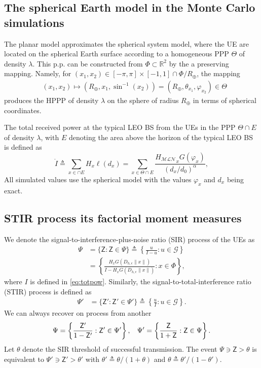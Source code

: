 \documentclass[lettersize,journal]{IEEEtran}
\newcommand{\rEarth}{R_{\oplus}}
\newcommand{\R}{\mathbb{R}}
\begin{document}
\subsection{The spherical Earth model in the Monte Carlo simulations }

\label{sec:sphericalmodel}
The planar model approximates the spherical system model, where the UE are located on the spherical Earth surface according to a homogeneous PPP $\Theta$ of density $\lambda$. This p.p. can be constructed from $\Phi \subset \R^2$ by the a preserving mapping. Namely, for $(x_1,x_2) \in [-\pi,\pi]\times[-1,1]\cap\Phi/\rEarth$, the mapping 
\begin{align}
  &(x_1,x_2)\mapsto (\rEarth,x_1,\sin^{-1}(x_2))=(\rEarth,\theta_{x_1},\varphi_{x_2}) \in \Theta
\end{align}
 produces the HPPP of density $\lambda$ on the sphere of radius $\rEarth$ in terms of spherical coordinates.

The total received power at the typical LEO BS from the UEs in the PPP $\Theta \cap E $ of density $\lambda$, with $E$ denoting the area above the horizon of the typical LEO BS is defined as
\begin{equation}
  \label{eq:mathringptot}
  \mathring{I} \triangleq  \sum_{x \in \cap E } H_x\ell(d_x) = \sum_{x \in \Theta \cap E }  \frac{{H_{\mathcal{M}\mathcal{L}\mathcal{N}}}_x G(\varphi_x)}{(d_x/d_0)^{\alpha}},
\end{equation}
All simulated values use the spherical model with the values $\varphi_x$ and $d_x$ being exact. 



\subsection{STIR process its factorial moment measures}
 We denote the signal-to-interference-plus-noise ratio (SIR) process of the UEs as
\begin{align}
  \label{eq:SINR}
  \Psi &= \{\mathsf{Z}: \mathsf{Z} \in \Psi\} \triangleq \left\{ \frac{u}{I-u} : u \in \mathcal{G}\right\} \nonumber \\
  &=\left\{ \frac{H_x G(D_{h,\epsilon}\|x\|)}{I-H_x G(D_{h,\epsilon}\|x\|)} : x \in \Phi\right\},
\end{align}
where $I$ is defined in \eqref{eq:totpow}. Similarly, the signal-to-total-interference ratio (STIR) process is defined as
\begin{align}
  \label{eq:STINR}
  \Psi' &= \{\mathsf{Z}': \mathsf{Z}' \in \Psi'\} \triangleq \left\{ \frac{u}{I} : u \in \mathcal{G}\right\}.
\end{align}
We can always recover on process from another
\begin{equation}
  \Psi = \left\{ \frac{\mathsf{Z}'}{1- \mathsf{Z}'}: \mathsf{Z}' \in \Psi' \right\}, \hspace{0.3cm} \Psi' = \left\{ \frac{\mathsf{Z}}{1+ \mathsf{Z}}: \mathsf{Z} \in \Psi \right\}.
\end{equation}
Let $\theta$ denote the SIR threshold of successful transmission. The event $\Psi \ni\mathsf{Z}> \theta$ is equivalent to $\Psi' \ni \mathsf{Z}'> \theta'$  with $\theta' \triangleq \theta/(1+\theta)$ and $\theta \triangleq \theta'/(1-\theta')$.
\end{document}
